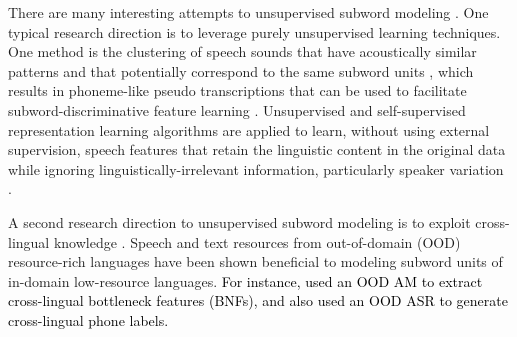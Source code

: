\documentclass[transmag]{IEEEtran}
\begin{document}
There are many interesting attempts to unsupervised subword modeling \cite{chen2015parallel,heck2017feature,oord2017neural,feng2019_TASLP,Tjandra2019,kahn2019librilight}. One typical research direction is to leverage purely unsupervised learning techniques. One method is the clustering of speech sounds that have acoustically similar patterns and that potentially correspond to the same subword units  \cite{chen2015parallel,ansari2017deep}, which results in phoneme-like pseudo transcriptions that can be used to facilitate subword-discriminative feature learning \cite{chen2015parallel,heck2017feature}.
Unsupervised and self-supervised representation learning algorithms are applied to learn, without using external supervision, speech features that retain the linguistic content in the original data while ignoring linguistically-irrelevant information, particularly speaker variation  \cite{oord2018cpc,oord2017neural,hsu2017nips,last2020unsupervised,Zeghidour+2016}. 


A second research direction to unsupervised subword modeling is to exploit cross-lingual knowledge \cite{shibata2017composite,feng2018exploiting}. Speech and text resources from out-of-domain (OOD) resource-rich languages have been shown beneficial to modeling subword units of in-domain low-resource languages. 
\textcolor{black}{For instance, \cite{shibata2017composite,feng2018exploiting} used an OOD AM to extract cross-lingual bottleneck features (BNFs), and \cite{feng2018exploiting} also used an OOD ASR to generate cross-lingual phone labels.}

\end{document}
